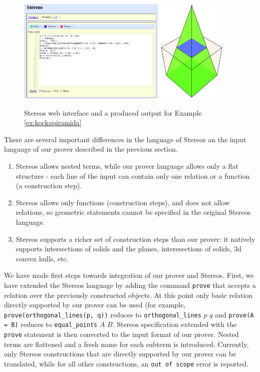 \documentclass[final,1p,times,authoryear]{elsarticle}
\begin{document}
\begin{figure}[!ht]
  \centering
  \includegraphics[height=5cm]{stereos-interface.png} \hspace{1cm} \includegraphics[height=5cm]{stereos.png}
  \caption{Stereos web interface and a produced output for Example \ref{ex:kockapiramida}}
  \label{fig:stereos}
\end{figure}

There are several important differences in the language of Stereos an
the input language of our prover described in the previous section. 
\begin{enumerate}
\item Stereos allows nested terms, while our prover language allows
  only a flat structure - each line of the input can contain only one
  relation or a function (a construction step).
\item Stereos allows only functions (construction steps), and does not
  allow relations, so geometric statements cannot be specified in the
  original Stereos language.
\item Stereos supports a richer set of construction steps than our
  prover: it natively supports intersections of solids and the planes,
  interesections of solids, 3d convex hulls, etc.
\end{enumerate}

We have made first steps towards integration of our prover and
Stereos. First, we have extended the Stereos language by adding the
command \texttt{prove} that accepts a relation over the previously
constructed objects. At this point only basic relation directly
supported by our prover can be used (for example,
\texttt{prove(orthogonal\_lines(p, q))} reduces to
\texttt{orthogonal\_lines} $p$ $q$ and \texttt{prove(A = B)} reduces
to \texttt{equal\_points} $A$ $B$. Stereos specification extended with
the \texttt{prove} statement is then converted to the input format of
our prover. Nested terms are flattened and a fresh name for each
subterm is introduced. Currently, only Stereos constructions that are
directly supported by our prover can be translated, while for all
other constructions, an \texttt{out of scope} error is reported.
\end{document}
